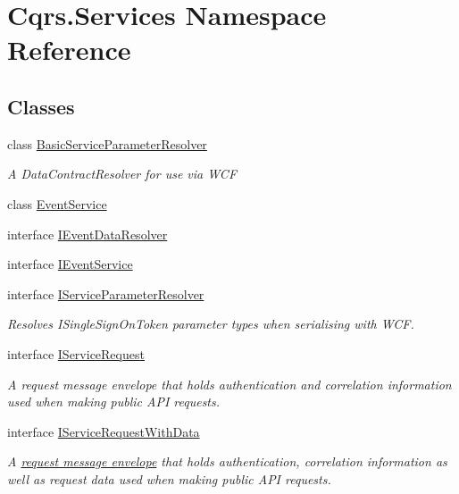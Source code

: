 \hypertarget{namespaceCqrs_1_1Services}{}\section{Cqrs.\+Services Namespace Reference}
\label{namespaceCqrs_1_1Services}
\subsection*{Classes}
\begin{DoxyCompactItemize}
\item 
class \hyperlink{classCqrs_1_1Services_1_1BasicServiceParameterResolver}{Basic\+Service\+Parameter\+Resolver}
\begin{DoxyCompactList}\small\item\em A Data\+Contract\+Resolver for use via W\+CF \end{DoxyCompactList}\item 
class \hyperlink{classCqrs_1_1Services_1_1EventService}{Event\+Service}
\item 
interface \hyperlink{interfaceCqrs_1_1Services_1_1IEventDataResolver}{I\+Event\+Data\+Resolver}
\item 
interface \hyperlink{interfaceCqrs_1_1Services_1_1IEventService}{I\+Event\+Service}
\item 
interface \hyperlink{interfaceCqrs_1_1Services_1_1IServiceParameterResolver}{I\+Service\+Parameter\+Resolver}
\begin{DoxyCompactList}\small\item\em Resolves I\+Single\+Sign\+On\+Token parameter types when serialising with W\+CF. \end{DoxyCompactList}\item 
interface \hyperlink{interfaceCqrs_1_1Services_1_1IServiceRequest}{I\+Service\+Request}
\begin{DoxyCompactList}\small\item\em A request message envelope that holds authentication and correlation information used when making public A\+PI requests. \end{DoxyCompactList}\item 
interface \hyperlink{interfaceCqrs_1_1Services_1_1IServiceRequestWithData}{I\+Service\+Request\+With\+Data}
\begin{DoxyCompactList}\small\item\em A \hyperlink{}{request message envelope} that holds authentication, correlation information as well as request data used when making public A\+PI requests. \end{DoxyCompactList}\item 

\end{DoxyCompactItemize}
